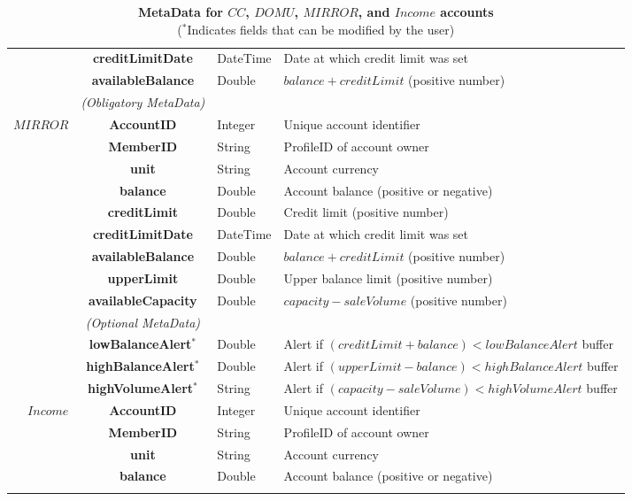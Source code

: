 \begin{table}[H]
\begin{centering}
{\begin{tabular}{ r | c | l | l }
			& {\bf creditLimitDate}		&DateTime & Date at which credit limit was set \\
			& {\bf availableBalance}		&Double	& $balance + creditLimit$ (positive number) \\
\Xhline{1.5pt}
			 & \emph{(Obligatory MetaData)}& & \\
\cline{2-2}
$MIRROR$ 	& {\bf AccountID}			&Integer	& Unique account identifier \\
			& {\bf MemberID}			&String	& ProfileID of account owner \\
			& {\bf unit}					&String	& Account currency \\
			& {\bf balance}				&Double	& Account balance (positive or negative) \\
			& {\bf creditLimit}			&Double	& Credit limit (positive number) \\
			& {\bf creditLimitDate}		&DateTime & Date at which credit limit was set \\
			& {\bf availableBalance}		&Double	& $balance + creditLimit$ (positive number) \\
			& {\bf upperLimit}			&Double	& Upper balance limit (positive number) \\
			& {\bf availableCapacity}		&Double	& $capacity - saleVolume$ (positive number) \\
\cline{2-2}
			 & \emph{(Optional MetaData)}& & \\
\cline{2-2}
			& {\bf lowBalanceAlert$^*$}		&Double	& Alert if $(creditLimit + balance) < lowBalanceAlert$ buffer \\
			& {\bf highBalanceAlert$^*$}		&Double	& Alert if $(upperLimit - balance) < highBalanceAlert$ buffer \\
			& {\bf highVolumeAlert$^*$}		&String	& Alert if $(capacity - saleVolume) < highVolumeAlert$ buffer \\
\Xhline{1.5pt}
$Income$ 		& {\bf AccountID}			&Integer	& Unique account identifier \\
			& {\bf MemberID}			&String	& ProfileID of account owner \\
			& {\bf unit}					&String	& Account currency \\
			& {\bf balance}				&Double	& Account balance (positive or negative) \\
\Xhline{1.5pt}
\end{tabular}
}
\caption{\small\textbf{MetaData for $CC$, $DOMU$, $MIRROR$, and $Income$ accounts}\\
($^*$Indicates fields that can be modified by the user)}
\label{tab:AccountMetaData1}
\end{centering}
\end{table}


